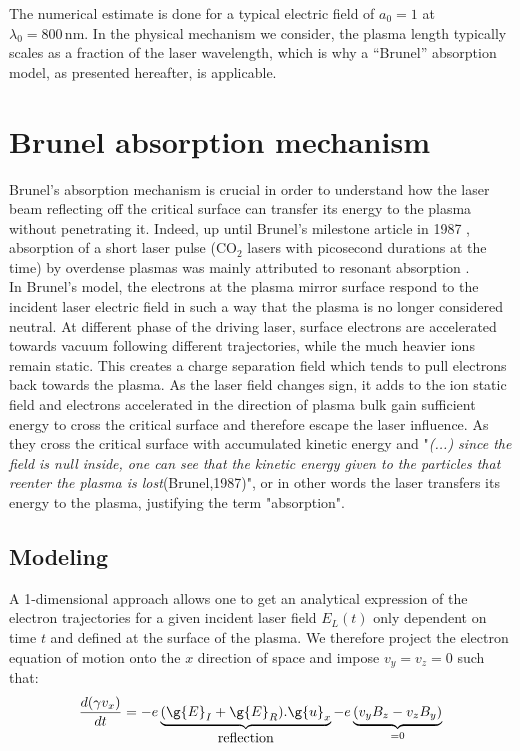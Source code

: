 \noindent The numerical estimate is done for a typical electric field of $a_0 = 1$ at $\lambda_0 = 800\,\mathrm{nm}$. In the physical mechanism we consider, the plasma length typically scales as a fraction of the laser wavelength, which is why  a ``Brunel'' absorption model, as presented hereafter, is applicable.






\section{Brunel absorption mechanism}
\label{section:Brunel absorption mechanism}

Brunel's absorption mechanism is crucial in order to understand how the laser beam reflecting off the critical surface can transfer its energy to the plasma without penetrating it. Indeed, up until Brunel's milestone article in 1987 \cite{Brunel1987}, absorption of a short laser pulse ($\mathrm{CO}_2$ lasers with picosecond durations  at the time) by overdense plasmas was mainly attributed to resonant absorption \cite{freidberg1972resonant}. \\

\noindent In Brunel's model, the electrons at the plasma mirror surface respond to the incident laser electric field in such a way that the plasma is no longer considered neutral. At different phase of the driving laser, surface electrons are accelerated towards vacuum following different trajectories, while the much heavier ions remain static. This creates a charge separation field which tends to pull electrons back towards the plasma. As the laser field changes sign, it adds to the ion static field and electrons accelerated in the direction of plasma bulk gain sufficient energy to cross the critical surface and therefore escape the laser influence. As they cross the critical surface with accumulated kinetic energy and "\textit{(...) since the field is null inside, one can see that the kinetic energy given to the particles that reenter the plasma is lost}(Brunel,1987\cite{Brunel1987})", or in other words the laser transfers its energy to the plasma, justifying the term "absorption".

\subsection{Modeling}

A 1-dimensional approach allows one to get an analytical expression of the electron trajectories for a given incident laser field $E_L(t)$ only dependent on time $t$ and defined at the surface of the plasma. We therefore project the electron equation of motion onto the $x$ direction of space and impose $v_y=v_z = 0$ such that:
\begin{equation}
\frac{d(\gamma v_x)}{dt} = -e\underbrace{(\g{E}_I+\g{E}_R).\g{u}_x}_{\mbox{reflection}} - e\underbrace{(v_y B_z - v_z B_y)}_{=0}
\end{equation}

